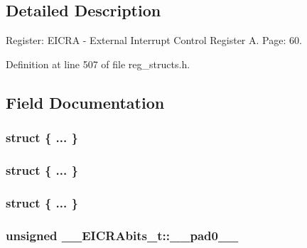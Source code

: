 \subsection{Detailed Description}
Register\+: E\+I\+C\+R\+A -\/ External Interrupt Control Register A. Page\+: 60. 

Definition at line 507 of file reg\+\_\+structs.\+h.



\subsection{Field Documentation}
\hypertarget{union_____e_i_c_r_abits__t_aae48915f070e06adec42a102b14979a1}{\subsubsection[{"@123}]{\setlength{\rightskip}{0pt plus 5cm}struct \{ ... \} }}\label{union_____e_i_c_r_abits__t_aae48915f070e06adec42a102b14979a1}
\hypertarget{union_____e_i_c_r_abits__t_a3ee6574e49a02574840690842f483793}{\subsubsection[{"@125}]{\setlength{\rightskip}{0pt plus 5cm}struct \{ ... \} }}\label{union_____e_i_c_r_abits__t_a3ee6574e49a02574840690842f483793}
\hypertarget{union_____e_i_c_r_abits__t_af4e2db7005b016c16495c3fa4efe1b88}{\subsubsection[{"@127}]{\setlength{\rightskip}{0pt plus 5cm}struct \{ ... \} }}\label{union_____e_i_c_r_abits__t_af4e2db7005b016c16495c3fa4efe1b88}
\hypertarget{union_____e_i_c_r_abits__t_afe338fe7e01cf0d19e3acb22b9ce7ffa}{
\subsubsection[{\+\_\+\+\_\+pad0\+\_\+\+\_\+}]{\setlength{\rightskip}{0pt plus 5cm}unsigned \+\_\+\+\_\+\+E\+I\+C\+R\+Abits\+\_\+t\+::\+\_\+\+\_\+pad0\+\_\+\+\_\+}}\label{union_____e_i_c_r_abits__t_afe338fe7e01cf0d19e3acb22b9ce7ffa}


